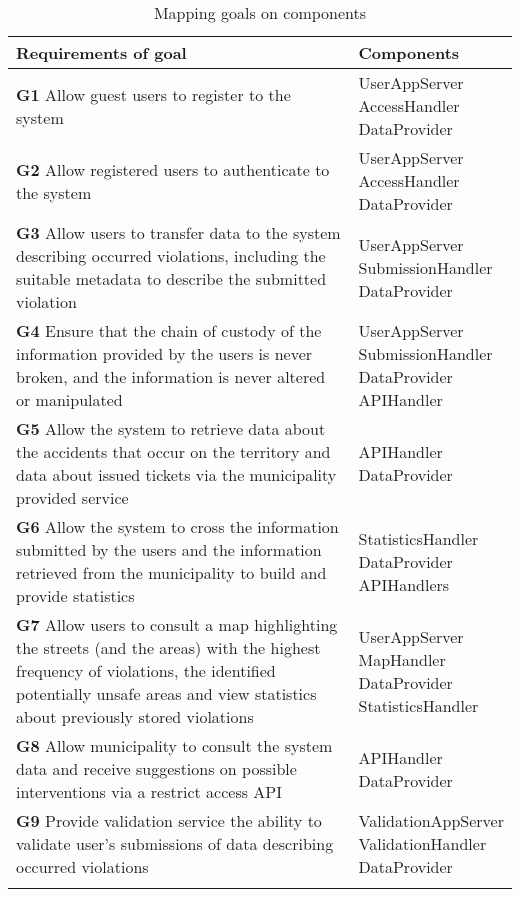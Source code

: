         \begin{longtable}{p{0.7\linewidth}p{0.3\linewidth}}
            \toprule
                \textbf{Requirements of goal} & \textbf{Components}\\
            \midrule
                \textbf{G1} Allow guest users to register to the system 
                    & \mbox{UserAppServer} \mbox{AccessHandler} \mbox{DataProvider}\\
            \midrule
                \textbf{G2} Allow registered users to authenticate to the system 
                    & \mbox{UserAppServer} \mbox{AccessHandler} \mbox{DataProvider}\\
            \midrule 
                \textbf{G3} Allow users to transfer data to the system describing occurred violations,
                 including the suitable metadata to describe the submitted violation 
                 & \mbox{UserAppServer} \mbox{SubmissionHandler} \mbox{DataProvider}\\
            \midrule
                \textbf{G4} Ensure that the chain of custody of the information provided by the users is never broken, 
                and the information is never altered or manipulated 
                & \mbox{UserAppServer} \mbox{SubmissionHandler} \mbox{DataProvider}  \mbox{APIHandler}\\
            \midrule
                \textbf{G5} Allow the system to retrieve data about the accidents that occur on the territory and data 
                about issued tickets via the municipality provided service 
                & \mbox{APIHandler} \mbox{DataProvider}\\
            \midrule
                \textbf{G6} Allow the system to cross the information submitted by the users and the information retrieved 
                from the municipality to build and provide statistics 
                & \mbox{StatisticsHandler} \mbox{DataProvider} \mbox{APIHandlers}\\
            \midrule
                \textbf{G7} Allow users to consult a map highlighting the streets (and the areas) with the highest frequency 
                of violations, the identiﬁed potentially unsafe areas and view statistics about previously stored violations 
                & \mbox{UserAppServer} \mbox{MapHandler} \mbox{DataProvider} \mbox{StatisticsHandler}\\
            \midrule
                \textbf{G8} Allow municipality to consult the system data and receive suggestions on possible interventions via 
                a restrict access API 
                & \mbox{APIHandler} \mbox{DataProvider}\\
            \midrule
                \textbf{G9} Provide validation service the ability to validate user’s submissions of data describing occurred violations
                & \mbox{ValidationAppServer} \mbox{ValidationHandler} \mbox{DataProvider}\\
            \bottomrule
            \caption{\label{tbl:mappingGoalsOnComponent}Mapping goals on components}
        \end{longtable} 

